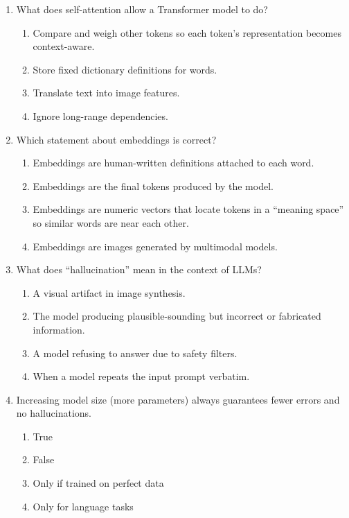 \documentclass[11pt,a4paper]{article}
\begin{document}
\begin{enumerate}[leftmargin=*, label=\textbf{\#\arabic*}]
  \item What does self-attention allow a Transformer model to do?\\
    \begin{enumerate}[label=\Alph*)]
      \item Compare and weigh other tokens so each token's representation becomes context-aware.
      \item Store fixed dictionary definitions for words.
      \item Translate text into image features.
      \item Ignore long-range dependencies.
    \end{enumerate}

  \item Which statement about embeddings is correct?\\
    \begin{enumerate}[label=\Alph*)]
      \item Embeddings are human-written definitions attached to each word.
      \item Embeddings are the final tokens produced by the model.
      \item Embeddings are numeric vectors that locate tokens in a ``meaning space'' so similar words are near each other.
      \item Embeddings are images generated by multimodal models.
    \end{enumerate}

  \item What does ``hallucination'' mean in the context of LLMs?\\
    \begin{enumerate}[label=\Alph*)]
      \item A visual artifact in image synthesis.
      \item The model producing plausible-sounding but incorrect or fabricated information.
      \item A model refusing to answer due to safety filters.
      \item When a model repeats the input prompt verbatim.
    \end{enumerate}

  \item Increasing model size (more parameters) always guarantees fewer errors and no hallucinations.\\
    \begin{enumerate}[label=\Alph*)]
      \item True
      \item False
      \item Only if trained on perfect data
      \item Only for language tasks
    \end{enumerate}


\end{enumerate}
\end{document}
